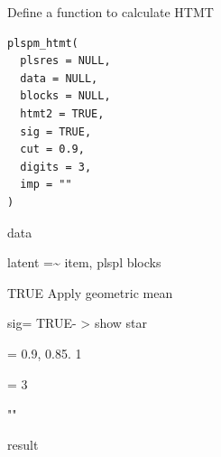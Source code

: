 \documentclass[a4paper]{book}
\begin{document}
%
\begin{Description}
Define a function to calculate HTMT
\end{Description}
%
\begin{Usage}
\begin{verbatim}
plspm_htmt(
  plsres = NULL,
  data = NULL,
  blocks = NULL,
  htmt2 = TRUE,
  sig = TRUE,
  cut = 0.9,
  digits = 3,
  imp = ""
)
\end{verbatim}
\end{Usage}
%
\begin{Arguments}
\begin{ldescription}
\item[\code{data}] data

\item[\code{blocks}] latent =\textasciitilde{} item, plspl blocks

\item[\code{htmt2}] TRUE Apply geometric mean

\item[\code{sig}] sig= TRUE- > show star

\item[\code{cut}] = 0.9, 0.85. 1

\item[\code{digits}] = 3

\item[\code{imp}] ""
\end{ldescription}
\end{Arguments}
%
\begin{Value}
result
\end{Value}
%
\end{document}
